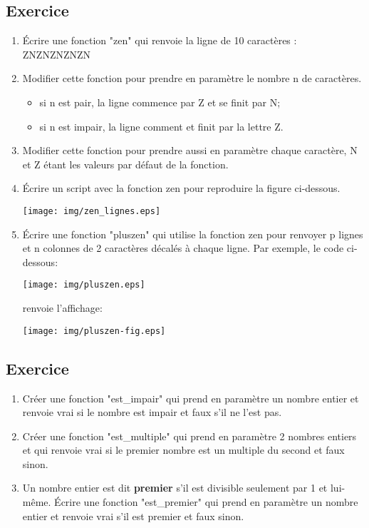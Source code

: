 \documentclass[11pt,a4paper]{article}
\newcounter{numexo}
\begin{document}
\newpage
\addtocounter{numexo}{1}
\subsection*{\Large Exercice \thenumexo }
\begin{enumerate}
\item Écrire une fonction "zen" qui renvoie la ligne de 10 caractères : ZNZNZNZNZN
\item Modifier cette fonction pour prendre en paramètre le nombre n de caractères.
\begin{itemize}
\item si n est pair, la ligne commence par Z et se finit par N;
\item si n est impair, la ligne comment et finit par la lettre Z.
\end{itemize}
\item Modifier cette fonction pour prendre aussi en paramètre chaque caractère, N et Z étant les valeurs par défaut de la fonction.
\item Écrire un script avec la fonction zen pour reproduire la figure ci-dessous.
\begin{center}
\texttt{[image: img/zen\_lignes.eps]}
\end{center}
\item Écrire une fonction "pluszen" qui utilise la fonction zen pour renvoyer p lignes et n colonnes de 2 caractères décalés à chaque ligne. Par exemple, le code ci-dessous:
\begin{center}
\texttt{[image: img/pluszen.eps]}
\end{center}
renvoie l'affichage:
\begin{center}
\texttt{[image: img/pluszen-fig.eps]}
\end{center}
\end{enumerate}

\addtocounter{numexo}{1}
\subsection*{\Large Exercice \thenumexo }
\begin{enumerate}
\item Créer une fonction "est\_impair" qui prend en paramètre un nombre entier et renvoie vrai si le nombre est impair et faux s'il ne l'est pas.
\item Créer une fonction "est\_multiple" qui prend en paramètre 2 nombres entiers et qui renvoie vrai si le premier nombre est un multiple du second et faux sinon.
\item Un nombre entier est dit \textbf{premier} s'il est divisible seulement par 1 et lui-même. Écrire une fonction "est\_premier" qui prend en paramètre un nombre entier et renvoie vrai s'il est premier et faux sinon.
\end{enumerate}
\end{document}
